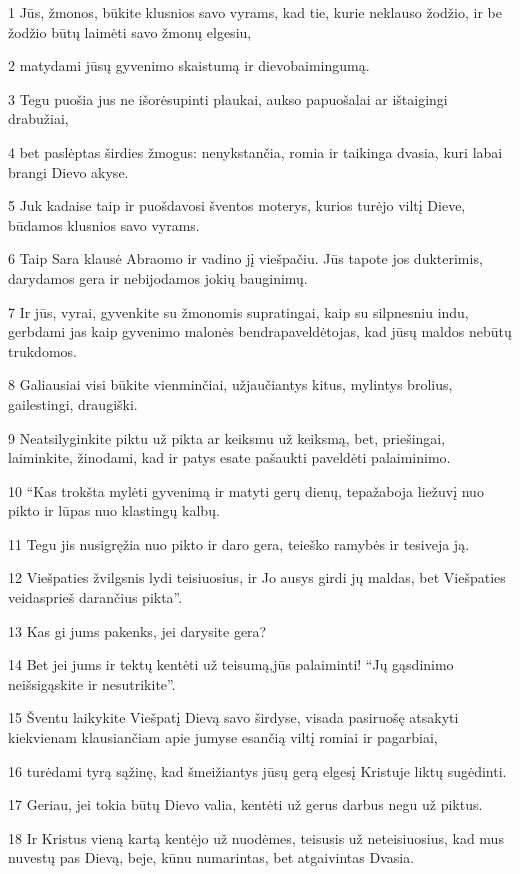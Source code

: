 \par 1 Jūs, žmonos, būkite klusnios savo vyrams, kad tie, kurie neklauso žodžio, ir be žodžio būtų laimėti savo žmonų elgesiu, 
\par 2 matydami jūsų gyvenimo skaistumą ir dievobaimingumą. 
\par 3 Tegu puošia jus ne išorė­supinti plaukai, aukso papuošalai ar ištaigingi drabužiai,­ 
\par 4 bet paslėptas širdies žmogus: nenykstančia, romia ir taikinga dvasia, kuri labai brangi Dievo akyse. 
\par 5 Juk kadaise taip ir puošdavosi šventos moterys, kurios turėjo viltį Dieve, būdamos klusnios savo vyrams. 
\par 6 Taip Sara klausė Abraomo ir vadino jį viešpačiu. Jūs tapote jos dukterimis, darydamos gera ir nebijodamos jokių bauginimų. 
\par 7 Ir jūs, vyrai, gyvenkite su žmonomis supratingai, kaip su silpnesniu indu, gerbdami jas kaip gyvenimo malonės bendrapaveldėtojas, kad jūsų maldos nebūtų trukdomos. 
\par 8 Galiausiai visi būkite vienminčiai, užjaučiantys kitus, mylintys brolius, gailestingi, draugiški. 
\par 9 Neatsilyginkite piktu už pikta ar keiksmu už keiksmą, bet, priešingai, laiminkite, žinodami, kad ir patys esate pašaukti paveldėti palaiminimo. 
\par 10 “Kas trokšta mylėti gyvenimą ir matyti gerų dienų, tepažaboja liežuvį nuo pikto ir lūpas nuo klastingų kalbų. 
\par 11 Tegu jis nusigręžia nuo pikto ir daro gera, teieško ramybės ir tesiveja ją. 
\par 12 Viešpaties žvilgsnis lydi teisiuosius, ir Jo ausys girdi jų maldas, bet Viešpaties veidas­prieš darančius pikta”. 
\par 13 Kas gi jums pakenks, jei darysite gera? 
\par 14 Bet jei jums ir tektų kentėti už teisumą,­jūs palaiminti! “Jų gąsdinimo neišsigąskite ir nesutrikite”. 
\par 15 Šventu laikykite Viešpatį Dievą savo širdyse, visada pasiruošę atsakyti kiekvienam klausiančiam apie jumyse esančią viltį romiai ir pagarbiai, 
\par 16 turėdami tyrą sąžinę, kad šmeižiantys jūsų gerą elgesį Kristuje liktų sugėdinti. 
\par 17 Geriau, jei tokia būtų Dievo valia, kentėti už gerus darbus negu už piktus. 
\par 18 Ir Kristus vieną kartą kentėjo už nuodėmes, teisusis už neteisiuosius, kad mus nuvestų pas Dievą, beje, kūnu numarintas, bet atgaivintas Dvasia. 
